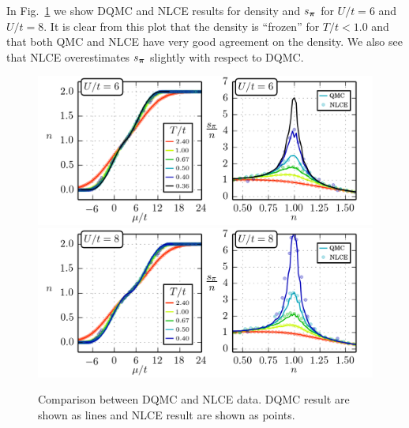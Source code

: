 In Fig.~\ref{fig:QMCvsNLCE} we show DQMC and NLCE results for density and
$s_{\bm{\pi}}$ for $U/t=6$ and $U/t=8$.  It is clear from this plot that the
density is ``frozen'' for $T/t < 1.0$ and that both QMC and NLCE have very good
agreement on the density.   We also see that NLCE overestimates $s_{\bm{\pi}}$
slightly with respect to DQMC. 
\begin{figure}
    \centering
\includegraphics[width=\textwidth]{../figures/hubbard-data/dataplots/QMC_Final/QMC_NLCE_Compare_U06.png}
\includegraphics[width=\textwidth]{../figures/hubbard-data/dataplots/QMC_Final/QMC_NLCE_Compare_U08.png}
\caption{Comparison between DQMC and NLCE data.  DQMC result are shown as lines
and NLCE result are shown as points.  } \label{fig:QMCvsNLCE}
\end{figure}


